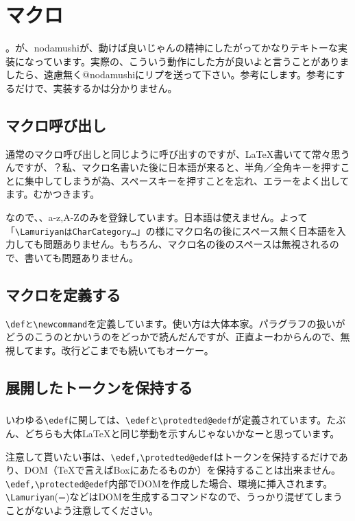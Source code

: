 \chapter{マクロ}
。が、nodamushiが、動けば良いじゃんの精神にしたがってかなりテキトーな実装になっています。実際の、こういう動作にした方が良いよと言うことがありましたら、遠慮無く@nodamushiにリプを送って下さい。参考にします。参考にするだけで、実装するかは分かりません。

\chapternav

\section{マクロ呼び出し}
通常のマクロ呼び出しと同じように呼び出すのですが、LaTeX書いてて常々思うんですが、{\color{cred}？}私、マクロ名書いた後に日本語が来ると、半角／全角キーを押すことに集中してしまうが為、スペースキーを押すことを忘れ、エラーをよく出してます。むかつきます。

なので、、a-z,A-Zのみを登録しています。日本語は使えません。よって「\verb+\LamuriyanはCharCategory…+」の様にマクロ名の後にスペース無く日本語を入力しても問題ありません。もちろん、マクロ名の後のスペースは無視されるので、書いても問題ありません。


\section{マクロを定義する}
\verb+\defと\newcommand+を定義しています。使い方は大体本家。パラグラフの扱いがどうのこうのとかいうのをどっかで読んだんですが、正直よーわからんので、無視してます。改行どこまでも続いてもオーケー。

\section{展開したトークンを保持する}
\tdef{}
\subsection{\vb}
いわゆる\verb+\edef+に関しては、\verb+\edefと\protedted@edef+が定義されています。たぶん、どちらも大体LaTeXと同じ挙動を示すんじゃないかなーと思っています。

注意して貰いたい事は、\verb+\edef,\protedted@edef+はトークンを保持するだけであり、DOM（TeXで言えばBoxにあたるものか）を保持することは出来ません。\verb+\edef,\protected@edef+内部でDOMを作成した場合、環境に挿入されます。\verb+\Lamuriyan+(=\Lamuriyan)などはDOMを生成するコマンドなので、うっかり混ぜてしまうことがないよう注意してください。

